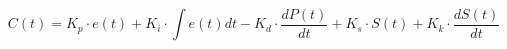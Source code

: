\documentclass[preview]{standalone}
\begin{document}
\[
C(t) = K_p \cdot e(t) + K_i \cdot \int{e(t)dt} - K_d \cdot \frac{dP(t)}{dt} + K_s \cdot S(t) + K_k \cdot \frac{dS(t)}{dt}
\]
\end{document}
